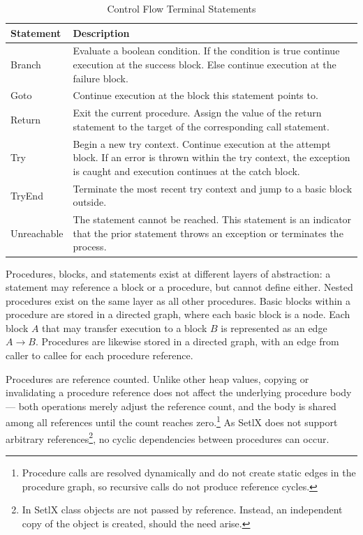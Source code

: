 \FloatBarrier
\begin{table}[H]
\begin{tabular}{|l|p{10cm}|}
	\hline
	\textbf{Statement} & \textbf{Description} \\
	\hline
	Branch      & Evaluate a boolean condition. If the condition is true continue execution at the success block. Else continue execution at the failure block. \\
	\hline
	Goto        & Continue execution at the block this statement points to. \\
	\hline
	Return      & Exit the current procedure. Assign the value of the return statement to the target of the corresponding call statement. \\
	\hline
	Try         & Begin a new try context. Continue execution at the attempt block. If an error is thrown within the try context, the exception is caught and execution continues at the catch block. \\
	\hline
	TryEnd      & Terminate the most recent try context and jump to a basic block outside. \\
	\hline
	Unreachable & The statement cannot be reached. This statement is an indicator that the prior statement throws an exception or terminates the process. \\
	\hline
\end{tabular}
\caption{Control Flow Terminal Statements}
\end{table}
\FloatBarrier

Procedures, blocks, and statements exist at different layers of abstraction: a statement may reference a block or a procedure, but cannot define either. Nested procedures exist on the same layer as all other procedures. Basic blocks within a procedure are stored in a directed graph, where each basic block is a node. Each block $A$ that may transfer execution to a block $B$ is represented as an edge $A \to B$. Procedures are likewise stored in a directed graph, with an edge from caller to callee for each procedure reference.

Procedures are reference counted. Unlike other heap values, copying or invalidating a procedure reference does not affect the underlying procedure body --- both operations merely adjust the reference count, and the body is shared among all references until the count reaches zero.\footnote{Procedure calls are resolved dynamically and do not create static edges in the procedure graph, so recursive calls do not produce reference cycles.} As SetlX does not support arbitrary references\footnote{In SetlX class objects are not passed by reference. Instead, an independent copy of the object is created, should the need arise.}, no cyclic dependencies between procedures can occur.

